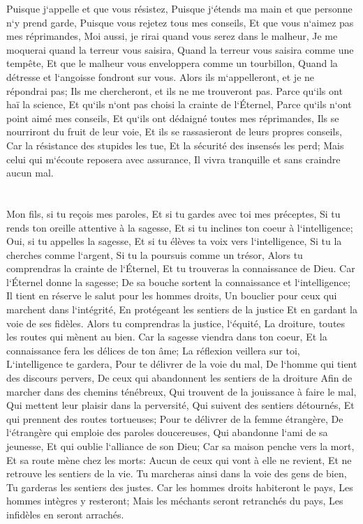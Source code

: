 \verse Puisque j`appelle et que vous résistez, Puisque j`étends ma main et que personne n`y prend garde, 
\verse Puisque vous rejetez tous mes conseils, Et que vous n`aimez pas mes réprimandes, 
\verse Moi aussi, je rirai quand vous serez dans le malheur, Je me moquerai quand la terreur vous saisira, 
\verse Quand la terreur vous saisira comme une tempête, Et que le malheur vous enveloppera comme un tourbillon, Quand la détresse et l`angoisse fondront sur vous. 
\verse Alors ils m`appelleront, et je ne répondrai pas; Ils me chercheront, et ils ne me trouveront pas. 
\verse Parce qu`ils ont haï la science, Et qu`ils n`ont pas choisi la crainte de l`Éternel, 
\verse Parce qu`ils n`ont point aimé mes conseils, Et qu`ils ont dédaigné toutes mes réprimandes, 
\verse Ils se nourriront du fruit de leur voie, Et ils se rassasieront de leurs propres conseils, 
\verse Car la résistance des stupides les tue, Et la sécurité des insensés les perd; 
\verse Mais celui qui m`écoute reposera avec assurance, Il vivra tranquille et sans craindre aucun mal. 

\chapter{}

\verse Mon fils, si tu reçois mes paroles, Et si tu gardes avec toi mes préceptes, 
\verse Si tu rends ton oreille attentive à la sagesse, Et si tu inclines ton coeur à l`intelligence; 
\verse Oui, si tu appelles la sagesse, Et si tu élèves ta voix vers l`intelligence, 
\verse Si tu la cherches comme l`argent, Si tu la poursuis comme un trésor, 
\verse Alors tu comprendras la crainte de l`Éternel, Et tu trouveras la connaissance de Dieu. 
\verse Car l`Éternel donne la sagesse; De sa bouche sortent la connaissance et l`intelligence; 
\verse Il tient en réserve le salut pour les hommes droits, Un bouclier pour ceux qui marchent dans l`intégrité, 
\verse En protégeant les sentiers de la justice Et en gardant la voie de ses fidèles. 
\verse Alors tu comprendras la justice, l`équité, La droiture, toutes les routes qui mènent au bien. 
\verse Car la sagesse viendra dans ton coeur, Et la connaissance fera les délices de ton âme; 
\verse La réflexion veillera sur toi, L`intelligence te gardera, 
\verse Pour te délivrer de la voie du mal, De l`homme qui tient des discours pervers, 
\verse De ceux qui abandonnent les sentiers de la droiture Afin de marcher dans des chemins ténébreux, 
\verse Qui trouvent de la jouissance à faire le mal, Qui mettent leur plaisir dans la perversité, 
\verse Qui suivent des sentiers détournés, Et qui prennent des routes tortueuses; 
\verse Pour te délivrer de la femme étrangère, De l`étrangère qui emploie des paroles doucereuses, 
\verse Qui abandonne l`ami de sa jeunesse, Et qui oublie l`alliance de son Dieu; 
\verse Car sa maison penche vers la mort, Et sa route mène chez les morts: 
\verse Aucun de ceux qui vont à elle ne revient, Et ne retrouve les sentiers de la vie. 
\verse Tu marcheras ainsi dans la voie des gens de bien, Tu garderas les sentiers des justes. 
\verse Car les hommes droits habiteront le pays, Les hommes intègres y resteront; 
\verse Mais les méchants seront retranchés du pays, Les infidèles en seront arrachés. 

